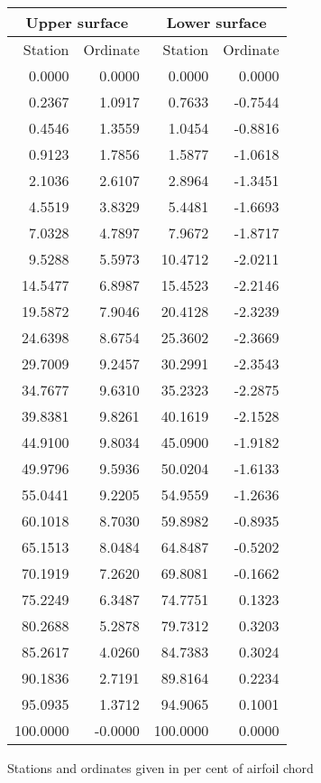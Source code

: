 \documentclass[11pt]{book}
\begin{document}
 \hspace{4mm}
 \begin{tabular}{|r|r|r|r|} \hline 
 \multicolumn{2}{|c|}{Upper surface} & \multicolumn{2}{|c|}{Lower surface} \\
 \hline
 Station & Ordinate & Station & Ordinate \\
 \hline
0.0000 & 0.0000 & 0.0000 & 0.0000 \\
0.2367 & 1.0917 & 0.7633 & -0.7544 \\
0.4546 & 1.3559 & 1.0454 & -0.8816 \\
0.9123 & 1.7856 & 1.5877 & -1.0618 \\
2.1036 & 2.6107 & 2.8964 & -1.3451 \\
4.5519 & 3.8329 & 5.4481 & -1.6693 \\
7.0328 & 4.7897 & 7.9672 & -1.8717 \\
9.5288 & 5.5973 & 10.4712 & -2.0211 \\
14.5477 & 6.8987 & 15.4523 & -2.2146 \\
19.5872 & 7.9046 & 20.4128 & -2.3239 \\
24.6398 & 8.6754 & 25.3602 & -2.3669 \\
29.7009 & 9.2457 & 30.2991 & -2.3543 \\
34.7677 & 9.6310 & 35.2323 & -2.2875 \\
39.8381 & 9.8261 & 40.1619 & -2.1528 \\
44.9100 & 9.8034 & 45.0900 & -1.9182 \\
49.9796 & 9.5936 & 50.0204 & -1.6133 \\
55.0441 & 9.2205 & 54.9559 & -1.2636 \\
60.1018 & 8.7030 & 59.8982 & -0.8935 \\
65.1513 & 8.0484 & 64.8487 & -0.5202 \\
70.1919 & 7.2620 & 69.8081 & -0.1662 \\
75.2249 & 6.3487 & 74.7751 & 0.1323 \\
80.2688 & 5.2878 & 79.7312 & 0.3203 \\
85.2617 & 4.0260 & 84.7383 & 0.3024 \\
90.1836 & 2.7191 & 89.8164 & 0.2234 \\
95.0935 & 1.3712 & 94.9065 & 0.1001 \\
100.0000 & -0.0000 & 100.0000 & 0.0000 \\
 \hline 
 \end{tabular}
 \vspace{8mm}

Stations and ordinates given in per cent of airfoil chord
\end{document}
